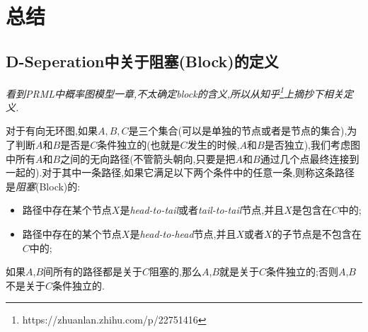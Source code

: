 \section*{总结}

\subsection*{D-Seperation中关于阻塞(Block)的定义}

\textit{看到PRML中概率图模型一章,不太确定block的含义,所以从知乎\footnote{https://zhuanlan.zhihu.com/p/22751416}上摘抄下相关定义.}

对于有向无环图,如果$A,B,C$是三个集合(可以是单独的节点或者是节点的集合),为了判断$A$和$B$是否是$C$条件独立的(也就是$C$发生的时候,$A$和$B$是否独立),我们考虑图中所有$A$和$B$之间的无向路径(不管箭头朝向,只要是把$A$和$B$通过几个点最终连接到一起的).对于其中一条路径,如果它满足以下两个条件中的任意一条,则称这条路径是\textit{阻塞}(Block)的:
\begin{itemize}
    \item 路径中存在某个节点$X$是\textit{head-to-tail}或者\textit{tail-to-tail}节点,并且$X$是包含在$C$中的;
    \item 路径中存在的某个节点$X$是\textit{head-to-head}节点,并且$X$或者$X$的子节点是不包含在$C$中的;
\end{itemize}
如果$A$,$B$间所有的路径都是关于$C$阻塞的,那么$A$,$B$就是关于$C$条件独立的;否则$A$,$B$不是关于$C$条件独立的.
